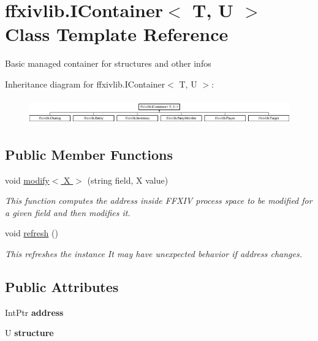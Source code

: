 \hypertarget{classffxivlib_1_1_i_container_3_01_t_00_01_u_01_4}{\section{ffxivlib.\-I\-Container$<$ T, U $>$ Class Template Reference}
\label{classffxivlib_1_1_i_container_3_01_t_00_01_u_01_4}
}


Basic managed container for structures and other infos  


Inheritance diagram for ffxivlib.\-I\-Container$<$ T, U $>$\-:\begin{figure}[H]
\begin{center}
\leavevmode
\includegraphics[height=1.117764cm]{classffxivlib_1_1_i_container_3_01_t_00_01_u_01_4}
\end{center}
\end{figure}
\subsection*{Public Member Functions}
\begin{DoxyCompactItemize}
\item 
void \hyperlink{classffxivlib_1_1_i_container_3_01_t_00_01_u_01_4_ae9081b3163d43d4d655dc72ea50b7a3d}{modify$<$ X $>$} (string field, X value)
\begin{DoxyCompactList}\small\item\em This function computes the address inside F\-F\-X\-I\-V process space to be modified for a given field and then modifies it. \end{DoxyCompactList}\item 
void \hyperlink{classffxivlib_1_1_i_container_3_01_t_00_01_u_01_4_adf190803540c072242e04f8380befc46}{refresh} ()
\begin{DoxyCompactList}\small\item\em This refreshes the instance It may have unexpected behavior if address changes. \end{DoxyCompactList}\end{DoxyCompactItemize}
\subsection*{Public Attributes}
\begin{DoxyCompactItemize}
\item 
\hypertarget{classffxivlib_1_1_i_container_3_01_t_00_01_u_01_4_a4c25b42d6bd8f3114947d137bea657c1}{Int\-Ptr {\bfseries address}}\label{classffxivlib_1_1_i_container_3_01_t_00_01_u_01_4_a4c25b42d6bd8f3114947d137bea657c1}

\item 
\hypertarget{classffxivlib_1_1_i_container_3_01_t_00_01_u_01_4_a4a077a13df5c84a292c1c03e05bc9ac7}{U {\bfseries structure}}\label{classffxivlib_1_1_i_container_3_01_t_00_01_u_01_4_a4a077a13df5c84a292c1c03e05bc9ac7}

\end{DoxyCompactItemize}


